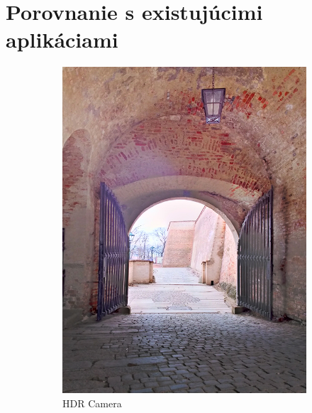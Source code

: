 \section{Porovnanie s existujúcimi aplikáciami}

\begin{figure}[h!]
    \centering
    \begin{subfigure}{0.3\textwidth}
        \includegraphics[width=\textwidth]{figures/tests/hdrApps/hdrCamera}
        \caption{HDR Camera}
        \label{fig:apps_1}
    \end{subfigure}
    ~
    \begin{subfigure}{0.3\textwidth}

\end{subfigure}
\end{figure}
